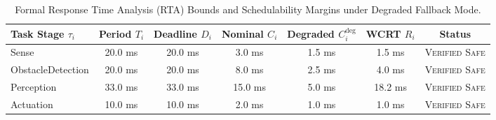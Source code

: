 \begin{table}[t]
\centering
\small
\caption{Formal Response Time Analysis (RTA) Bounds and Schedulability Margins under Degraded Fallback Mode.}
\label{tab:rta_proof}
\begin{tabular}{lcccccc}
\toprule
\textbf{Task Stage $\tau_i$} & \textbf{Period $T_i$} & \textbf{Deadline $D_i$} & \textbf{Nominal $C_i$} & \textbf{Degraded $C_i^{\text{deg}}$} & \textbf{WCRT $R_i$} & \textbf{Status} \\
\midrule
Sense             & 20.0 ms & 20.0 ms & 3.0 ms  & 1.5 ms & 1.5 ms  & \textsc{Verified Safe} \\
ObstacleDetection & 20.0 ms & 20.0 ms & 8.0 ms  & 2.5 ms & 4.0 ms  & \textsc{Verified Safe} \\
Perception        & 33.0 ms & 33.0 ms & 15.0 ms & 5.0 ms & 18.2 ms & \textsc{Verified Safe} \\
Actuation         & 10.0 ms & 10.0 ms & 2.0 ms  & 1.0 ms & 1.0 ms  & \textsc{Verified Safe} \\
\bottomrule
\end{tabular}
\end{table}
